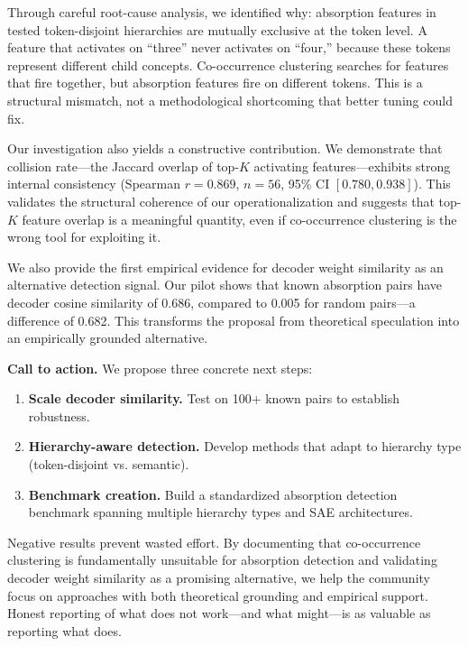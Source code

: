 \documentclass{article}
\begin{document}
Through careful root-cause analysis, we identified why: absorption features in tested token-disjoint hierarchies are mutually exclusive at the token level. A feature that activates on ``three'' never activates on ``four,'' because these tokens represent different child concepts. Co-occurrence clustering searches for features that fire together, but absorption features fire on different tokens. This is a structural mismatch, not a methodological shortcoming that better tuning could fix.

Our investigation also yields a constructive contribution. We demonstrate that collision rate---the Jaccard overlap of top-$K$ activating features---exhibits strong internal consistency (Spearman $r = 0.869$, $n = 56$, 95\% CI $[0.780, 0.938]$). This validates the structural coherence of our operationalization and suggests that top-$K$ feature overlap is a meaningful quantity, even if co-occurrence clustering is the wrong tool for exploiting it.

We also provide the first empirical evidence for decoder weight similarity as an alternative detection signal. Our pilot shows that known absorption pairs have decoder cosine similarity of 0.686, compared to 0.005 for random pairs---a difference of 0.682. This transforms the proposal from theoretical speculation into an empirically grounded alternative.

\textbf{Call to action.} We propose three concrete next steps:
\begin{enumerate}
\item \textbf{Scale decoder similarity.} Test on 100+ known pairs to establish robustness.
\item \textbf{Hierarchy-aware detection.} Develop methods that adapt to hierarchy type (token-disjoint vs. semantic).
\item \textbf{Benchmark creation.} Build a standardized absorption detection benchmark spanning multiple hierarchy types and SAE architectures.
\end{enumerate}

Negative results prevent wasted effort. By documenting that co-occurrence clustering is fundamentally unsuitable for absorption detection and validating decoder weight similarity as a promising alternative, we help the community focus on approaches with both theoretical grounding and empirical support. Honest reporting of what does not work---and what might---is as valuable as reporting what does.



\end{document}
